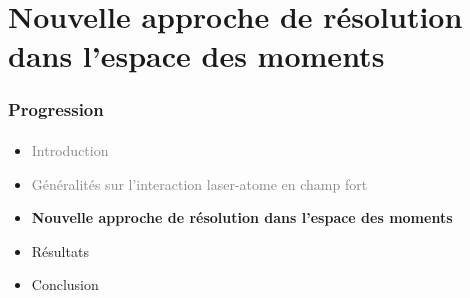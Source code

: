 \section{Nouvelle approche de r\'esolution dans l'espace des moments}

\begin{frame}
 \frametitle{Progression}
 \framesubtitle{}
 \begin{itemize}
   \item \textcolor{gray}{Introduction}
   \item \textcolor{gray}{G\'en\'eralit\'es sur l'interaction laser-atome 
en champ fort}
   \item \textbf{Nouvelle approche de r\'esolution 
dans l'espace des moments}
   \item R\'esultats
   \item Conclusion
 \end{itemize}
\end{frame}



